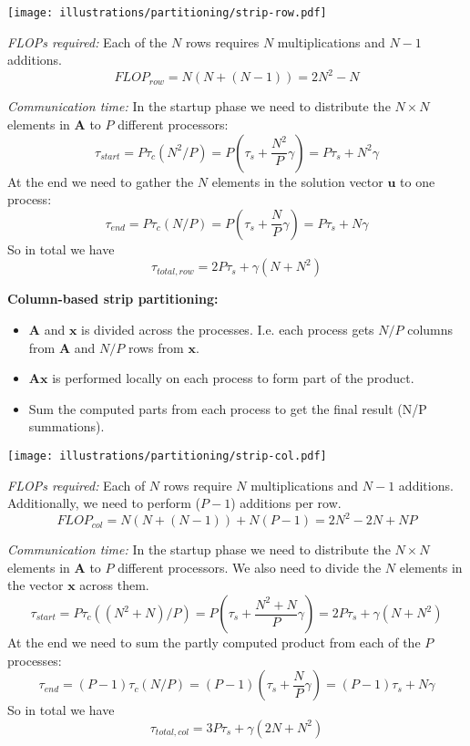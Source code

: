 \begin{center}
  \texttt{[image: illustrations/partitioning/strip-row.pdf]}
\end{center}

\noindent \emph{FLOPs required:} Each of the $N$ rows requires $N$ multiplications and $N-1$ additions.
\[
  FLOP_{row} = N ( N + (N-1) ) = 2N^2 - N
\]

\noindent \emph{Communication time:} In the startup phase we need to distribute the $N\times N$ elements in $\mathbf{A}$ to $P$ different processors:
\[
  \tau_{start} = P\tau_c(N^2/P) = P \left( \tau_s + \frac{N^2}{P} \gamma \right) = P\tau_s + N^2 \gamma
\]
At the end we need to gather the $N$ elements in the solution vector $\mathbf{u}$ to one process:
\[
  \tau_{end} = P\tau_c(N/P) = P \left( \tau_s + \frac{N}{P} \gamma \right) = P\tau_s + N\gamma
\]
So in total we have
\[
  \tau_{total,row} = 2P\tau_s + \gamma(N+N^2)
\]



\noindent\textbf{Column-based strip partitioning:}

\begin{itemize}
  \item $\mathbf{A}$ and $\mathbf{x}$ is divided across the processes. I.e. each process gets $N/P$ columns from $\mathbf{A}$ and $N/P$ rows from $\mathbf{x}$.
  \item $\mathbf{Ax}$ is performed locally on each process to form part of the product.
  \item Sum the computed parts from each process to get the final result (N/P summations).
\end{itemize}

\begin{center}
  \texttt{[image: illustrations/partitioning/strip-col.pdf]}
\end{center}

\noindent \emph{FLOPs required:} Each of $N$ rows require $N$ multiplications and $N-1$ additions. Additionally, we need to perform ($P-1$) additions per row.
\[
  FLOP_{col} =  N ( N + (N-1) ) + N( P-1 ) = 2N^2  - 2N + NP
\]

\noindent \emph{Communication time:} In the startup phase we need to distribute the $N\times N$ elements in $\mathbf{A}$ to $P$ different processors. We also need to divide the $N$ elements in the vector $\mathbf{x}$ across them.
\[
  \tau_{start} = P\tau_c((N^2+N)/P) = P \left( \tau_s + \frac{N^2+N}{P} \gamma \right) = 2P\tau_s + \gamma(N+N^2)
\]
At the end we need to sum the partly computed product from each of the $P$ processes:
\[
  \tau_{end} = (P-1)\tau_c(N/P) = (P-1) \left( \tau_s + \frac{N}{P} \gamma \right) = (P-1)\tau_s + N\gamma
\]
So in total we have
\[
  \tau_{total,col} = 3P\tau_s + \gamma(2N+N^2)
\]


